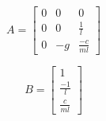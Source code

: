     
\begin{equation}
    A
    =
    \begin{bmatrix} 
        0& 0& 0 \\
        0& 0& \frac{1}{l}\\
        0& -g& \frac{-c}{ml}
    \end{bmatrix}
\end{equation}

\begin{equation}
    B
    =
    \begin{bmatrix} 
        1 \\
        \frac{-1}{l}\\
        \frac{c}{ml}
    \end{bmatrix}
\end{equation}

